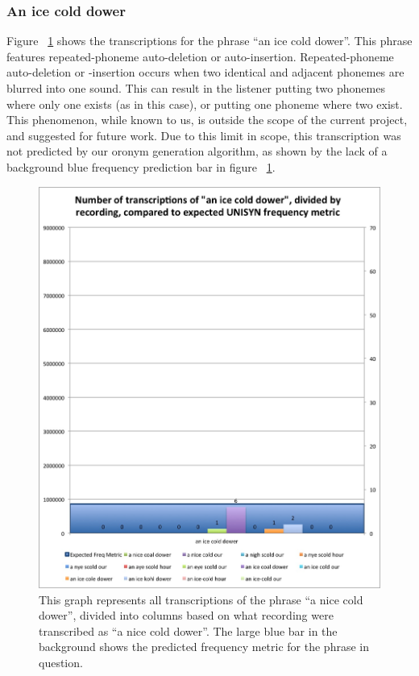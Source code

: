 \subsubsection{An ice cold dower}
\label{results:transcriptionCountPerRecording:an_ice_cold_dower}

Figure ~\ref{fig:results:transcriptionCountPerRecordingANiceColdDower} shows the transcriptions for the phrase ``an ice cold dower''. This phrase features repeated-phoneme auto-deletion or auto-insertion. Repeated-phoneme auto-deletion or -insertion occurs when two identical and adjacent phonemes are blurred into one sound.  This can result in the listener putting two phonemes where only one exists (as in this case), or putting one phoneme where two exist. This phenomenon, while known to us, is outside the scope of the current project, and suggested for future work.  Due to this limit in scope, this transcription was not predicted by our oronym generation algorithm, as shown by the lack of a background blue frequency prediction bar in figure ~\ref{fig:results:transcriptionCountPerRecordingANiceColdDower}.

\begin{figure}
\includegraphics[width=\textwidth]{TranscriptionCountPerRecording_anIceColdDower.jpg}
\captionfonts
\caption[Transcription Count Per Recording for the transcribed phrase ``a nice cold dower'']{ This graph represents all transcriptions of the phrase ``a nice cold dower'', divided into columns based on what recording were transcribed as ``a nice cold dower''. The large blue bar in the background shows the predicted frequency metric for the phrase in question.}
\label{fig:results:transcriptionCountPerRecordingANiceColdDower}
\end{figure}


